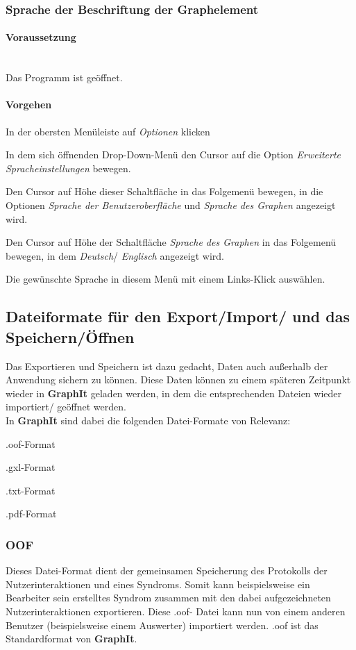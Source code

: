 \documentclass[enabledeprecatedfontcommands,fontsize=11pt,paper=a4,twoside]{scrartcl}
\newcounter{one}
\newcounter{two}[one]
\newcommand*{\condition}{\paragraph{Voraussetzung}$\;$ \vspace{0.2cm}\\}
\newcommand*{\action}{\paragraph{Vorgehen}}
\let\tempone\itemize
\let\temptwo\enditemize
\renewenvironment{itemize}{\tempone\addtolength{\itemsep}{-10.0pt}}{\temptwo}
\let\origenumerate\enumerate
\let\origendenumerate\endenumerate
\renewenvironment{enumerate}{\origenumerate \addtolength{\itemsep}{-10.0pt}}{\origendenumerate}
\begin{document}
\subsubsection{Sprache der Beschriftung der Graphelement}
		\condition 	
		Das Programm ist geöffnet.
		\action
		\begin{enumerate}
				\item In der obersten Menüleiste auf \textit{Optionen} klicken 
				\item In dem sich öffnenden Drop-Down-Menü den Cursor auf die Option \textit{Erweiterte Spracheinstellungen} bewegen.
				\item Den Cursor auf Höhe dieser Schaltfläche in das Folgemenü bewegen, in die Optionen \textit{Sprache der Benutzeroberfläche} und \textit{Sprache des Graphen} angezeigt wird.
				\item Den Cursor auf Höhe der Schaltfläche \textit{Sprache des Graphen} in das Folgemenü bewegen, in dem \textit{Deutsch}/ \textit{Englisch} angezeigt wird.
				\item Die gewünschte Sprache in diesem Menü mit einem Links-Klick auswählen.
		\end{enumerate}
	 	
\subsection{Dateiformate für den Export/Import/ und das Speichern/Öffnen} 
Das Exportieren und Speichern ist dazu gedacht, Daten auch außerhalb der Anwendung sichern zu können. Diese Daten können zu einem späteren Zeitpunkt wieder in \textbf{GraphIt} geladen werden, in dem die entsprechenden Dateien wieder importiert/ geöffnet werden.\\
In \textbf{GraphIt} sind dabei die folgenden Datei-Formate von Relevanz: 
\begin{itemize}
\item .oof-Format
\item .gxl-Format
\item .txt-Format
\item .pdf-Format
\end{itemize}

	\subsubsection{OOF}
	Dieses Datei-Format dient der gemeinsamen Speicherung des Protokolls der Nutzerinteraktionen und eines Syndroms. Somit kann beispielsweise ein Bearbeiter sein erstelltes Syndrom zusammen mit den dabei aufgezeichneten Nutzerinteraktionen exportieren. Diese .oof- Datei kann nun von einem anderen Benutzer (beispielsweise einem Auswerter) importiert werden. .oof ist das Standardformat von \textbf{GraphIt}.
	
\end{document}
